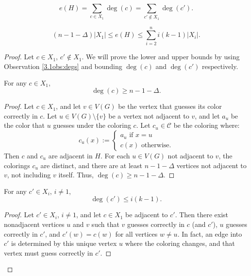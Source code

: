 \documentclass[10pt,a4paper]{amsart}
\begin{document}
\begin{obs}\label{3.1obs:degs} $$e(H)=\sum_{c\in X_1} \deg(c)=\sum_{c' \notin X_1} \deg(c').$$\end{obs}

\begin{lemma}\label{3.2lem} %
     $$(n-1-\Delta)|X_1| \leq e(H) \leq \sum_{i=2}^n i(k-1)|X_i|.$$
\end{lemma}

\begin{proof}
Let $c \in X_1$, $c' \not \in X_1$. We will prove the lower and upper bounds by using Observation \ref{3.1obs:degs} and bounding $\deg (c)$ and $\deg(c')$ respectively.
\begin{claim}\label{3.3clm} For any $c\in X_1$, 
    $$\deg (c)\geq n-1-\Delta.$$
\end{claim}
\begin{proof}
    Let $c \in X_1$, and let $v \in V(G)$ be the vertex that guesses its color correctly in $c$. Let $u \in V(G)\setminus \{v\}$ be a vertex not adjacent to $v$, and let $a_u$ be the color that $u$ guesses under the coloring $c$. 
        Let $c_u \in \mathcal{C}$ be the coloring where:
        $$c_u(x):= \begin{cases} a_u \text{ if }x = u \\c(x) \text{ otherwise.}
        \end{cases}$$
        Then $c$ and $c_u$ are adjacent in $H$. For each $u \in V(G)$ not adjacent to $v$, the colorings $c_u$ are distinct, and there are at least $n-1-\Delta$ vertices not adjacent to $v$, not including $v$ itself. Thus, $\deg(c)\geq n-1-\Delta$. %
\end{proof}
\begin{claim}\label{3.4clm} For any $c'\in X_i$, $i\neq 1$,  
    $$\deg(c')\leq  i(k-1).$$
\end{claim}
\begin{proof}
    Let $c' \in X_i$, $i\neq 1$, and let $c \in X_1$ be adjacent to $c'$. Then there exist nonadjacent vertices $u$ and $v$ such that $v$ guesses correctly in $c$ (and $c'$), $u$ guesses correctly in $c'$, and $c'(w)=c(w)$ for all vertices $w \neq u$.
    In fact, an edge into $c'$ is determined by this unique vertex $u$ where the coloring changes, and that vertex must guess correctly in $c'$. 


\end{proof}
\end{proof}
\end{document}
